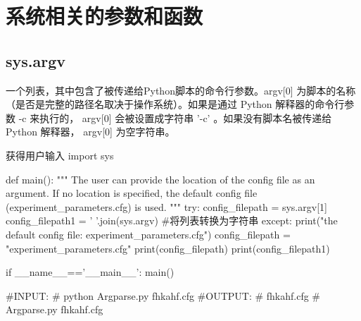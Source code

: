 \documentclass[11pt]{article}
\begin{document}
\section{系统相关的参数和函数}
\subsection{sys.argv}
一个列表，其中包含了被传递给Python脚本的命令行参数。argv[0] 为脚本的名称（是否是完整的路径名取决于操作系统）。如果是通过 Python 解释器的命令行参数 -c 来执行的， argv[0] 会被设置成字符串 '-c' 。如果没有脚本名被传递给 Python 解释器， argv[0] 为空字符串。
\begin{Python}{获得用户输入}
import sys

def main():
	"""
	The user can provide the location of the config file as an argument.
	If no location is specified, the default config file (experiment_parameters.cfg) is used.
	"""
	try:
	config_filepath = sys.argv[1]
	config_filepath1 = ' '.join(sys.argv)	#将列表转换为字符串
	except:
	print("\nUsing the default config file: experiment_parameters.cfg\n")
	config_filepath = "experiment_parameters.cfg"
	print(config_filepath)
	print(config_filepath1)

if __name__=='__main__':
main()

#INPUT:
#       python Argparse.py fhkahf.cfg
#OUTPUT:
#       fhkahf.cfg
#       Argparse.py fhkahf.cfg
\end{Python}
\end{document}
